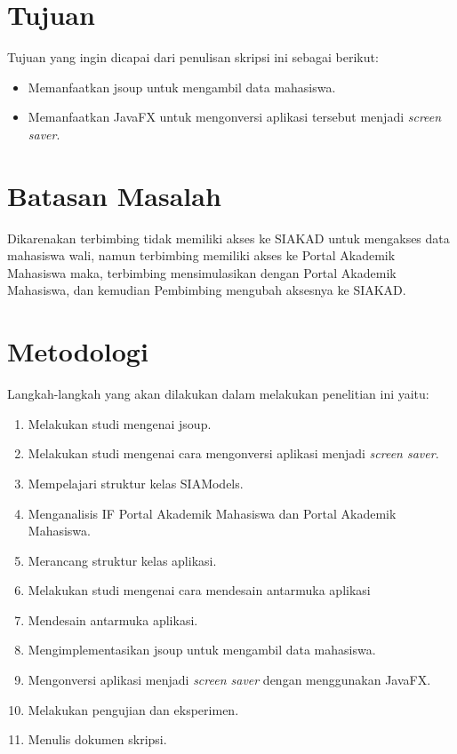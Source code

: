 \section{Tujuan}
\label{sec:tujuan}
Tujuan yang ingin dicapai dari penulisan skripsi ini sebagai berikut:
\begin{itemize}
    \item Memanfaatkan jsoup untuk mengambil data mahasiswa.
    \item Memanfaatkan JavaFX untuk mengonversi aplikasi tersebut menjadi \textit{screen saver}.
\end{itemize}

\section{Batasan Masalah}
\label{sec:batasan}
Dikarenakan terbimbing tidak memiliki akses ke SIAKAD untuk mengakses data mahasiswa wali, namun terbimbing memiliki akses ke Portal Akademik Mahasiswa maka, terbimbing mensimulasikan dengan Portal Akademik Mahasiswa, dan kemudian Pembimbing mengubah aksesnya ke SIAKAD. 

\section{Metodologi}
\label{sec:metlit}
Langkah-langkah yang akan dilakukan dalam melakukan penelitian ini yaitu:
	\begin{enumerate}
		\item Melakukan studi mengenai jsoup.
		\item Melakukan studi mengenai cara mengonversi aplikasi menjadi \textit{screen saver}.
		\item Mempelajari struktur kelas SIAModels.
		\item Menganalisis IF Portal Akademik Mahasiswa dan Portal Akademik Mahasiswa.
		\item Merancang struktur kelas aplikasi.
		\item Melakukan studi mengenai cara mendesain antarmuka aplikasi
	    \item Mendesain antarmuka aplikasi.
	    \item Mengimplementasikan jsoup untuk mengambil data mahasiswa.
        \item Mengonversi aplikasi menjadi \textit{screen saver} dengan menggunakan JavaFX. 
		\item Melakukan pengujian dan eksperimen.
		\item Menulis dokumen skripsi.
	\end{enumerate}

